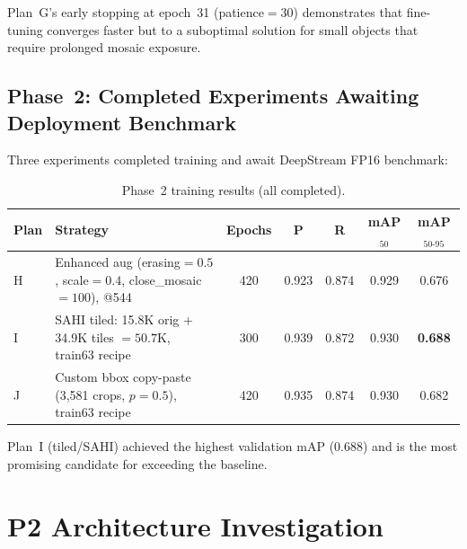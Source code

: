 \documentclass[12pt, titlepage]{article}
\begin{document}
Plan~G's early stopping at epoch~31 (patience$=30$) demonstrates that
fine-tuning converges faster but to a suboptimal solution for small objects
that require prolonged mosaic exposure.

\subsection{Phase~2: Completed Experiments Awaiting Deployment Benchmark}

Three experiments completed training and await DeepStream FP16 benchmark:

\begin{table}[H]
  \centering
  \caption{Phase~2 training results (all completed).}
  \label{tab:phase2}
  \small
  \begin{tabular}{@{}lp{4.2cm}ccccc@{}}
    \toprule
    \textbf{Plan}              & \textbf{Strategy}                               & \textbf{Epochs}               & \textbf{P} &
    \textbf{R}                 & \textbf{mAP$_{50}$}                             & \textbf{mAP$_{50\text{-}95}$}                               \\
    \midrule
    H                          & Enhanced aug (erasing$=0.5$, scale$=0.4$,
    close\_mosaic$=100$), @544 &
    420                        & 0.923                                           & 0.874                         & 0.929      & 0.676          \\
    I                          & SAHI tiled: 15.8K orig + 34.9K tiles $= 50.7$K,
    train63 recipe             &
    300                        & 0.939                                           & 0.872                         & 0.930      & \textbf{0.688} \\
    J                          & Custom bbox copy-paste (3{,}581 crops,
    $p{=}0.5$), train63 recipe &
    420                        & 0.935                                           & 0.874                         & 0.930      & 0.682          \\
    \bottomrule
  \end{tabular}
\end{table}

Plan~I (tiled/SAHI) achieved the highest validation mAP ($0.688$) and is the
most promising candidate for exceeding the baseline.

\section{P2 Architecture Investigation}
\label{sec:p2_failure}
\end{document}
